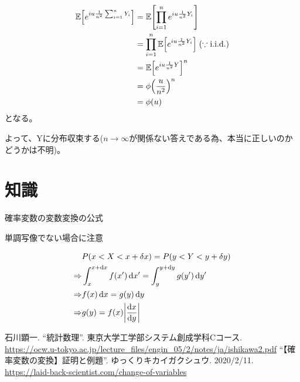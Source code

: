 \documentclass[a4paper, 10pt, dvipdfmx]{jlreq}
\begin{document}
\begin{align*}
  \mathbb{E}\qty[e^{iu\frac{1}{n^2}\sum_{i=1}^n{Y_i}}] & =\mathbb{E}\qty[\prod_{i=1}^{n}e^{iu\frac{1}{n^2}Y_i}]                             \\
                                                       & =\prod_{i=1}^{n}\mathbb{E}\qty[e^{iu\frac{1}{n^2}Y_i}] \; (\because \text{i.i.d.}) \\
                                                       & =\mathbb{E}\qty[e^{iu\frac{1}{n^2}Y}]^n                                            \\
                                                       & =\phi\qty(\frac{u}{n^2})^n                                                         \\
                                                       & =\phi(u)
\end{align*}
となる。

よって、Yに分布収束する($n \to \infty$が関係ない答えである為、本当に正しいのかどうかは不明)。

\section{知識}

確率変数の変数変換の公式\cite{label:1}

単調写像でない場合に注意\cite{label:2}

\begin{align*}
              & P(x<X<x+\delta x)=P(y<Y<y+\delta y)                              \\
  \Rightarrow & \int_{x}^{x+\dd{x}}f(x')\dd{x'}= \int_{y}^{y+\dd{y}}g(y')\dd{y'} \\
  \Rightarrow & f(x)\dd{x}=g(y)\dd{y}                                            \\
  \Rightarrow & g(y)=f(x)\abs{\dv{x}{y}}
\end{align*}

\begin{thebibliography}{9}
  石川顕一. ``統計数理''. 東京大学工学部システム創成学科Cコース. \\\url{https://ocw.u-tokyo.ac.jp/lecture_files/engin_05/2/notes/ja/ishikawa2.pdf}
  ``【確率変数の変換】証明と例題''. ゆっくりキカイガクシュウ. 2020/2/11. \\\url{https://laid-back-scientist.com/change-of-variables}
\end{thebibliography}
\end{document}
